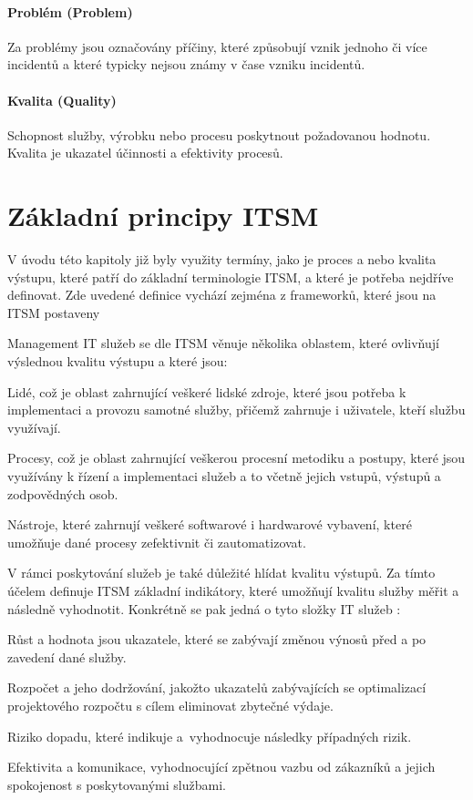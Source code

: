\documentclass[
  digital,     %
  twoside,     %
  lof,         %
  lot,         %
]{fithesis4}
\begin{document}
\paragraph{Problém (Problem)}
Za problémy jsou označovány příčiny, které způsobují vznik jednoho či více incidentů a které typicky nejsou známy v čase vzniku incidentů.
\paragraph{Kvalita (Quality)}
Schopnost služby, výrobku nebo procesu poskytnout požadovanou hodnotu. Kvalita je ukazatel účinnosti a efektivity procesů.
\section{Základní principy ITSM}
V úvodu této kapitoly již byly využity termíny, jako je proces a nebo kvalita výstupu, které patří do základní terminologie ITSM, a které je potřeba nejdříve definovat. Zde uvedené definice vychází zejména z frameworků, které jsou na ITSM postaveny

Management IT služeb se dle ITSM věnuje několika oblastem, které ovlivňují výslednou kvalitu výstupu a které jsou:
\begin{compactitem}
  \item Lidé, což je oblast zahrnující veškeré lidské zdroje, které jsou potřeba k implementaci a provozu samotné služby, přičemž zahrnuje i uživatele, kteří službu využívají.
  \item Procesy, což je oblast zahrnující veškerou procesní metodiku a postupy, které jsou využívány k řízení a implementaci služeb a to včetně jejich vstupů, výstupů a zodpovědných osob.
  \item Nástroje, které zahrnují veškeré softwarové i hardwarové vybavení, které umožňuje dané procesy zefektivnit či zautomatizovat.
\end{compactitem}

V rámci poskytování služeb je také důležité hlídat kvalitu výstupů. Za tímto účelem definuje ITSM základní indikátory, které umožňují kvalitu služby měřit a následně vyhodnotit. Konkrétně se pak jedná o tyto složky IT služeb \parencite[s.~20]{Matula2017}:
\begin{compactitem}
\item Růst a hodnota jsou ukazatele, které se zabývají změnou výnosů před a po zavedení dané služby.
\item Rozpočet a jeho dodržování, jakožto ukazatelů zabývajících se optimalizací projektového rozpočtu s cílem eliminovat zbytečné výdaje.
\item Riziko dopadu, které indikuje a vyhodnocuje následky případných rizik.
\item Efektivita a komunikace, vyhodnocující zpětnou vazbu od zákazníků a jejich spokojenost s poskytovanými službami.
\end{compactitem}
\end{document}
